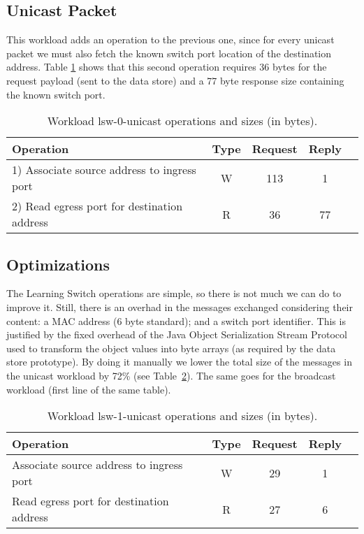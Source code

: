 \subsection{Unicast Packet}
This workload adds an operation to the previous one, since for every unicast packet we must also fetch the known switch port location of the destination address. Table \ref{table:lsw0:unicast} shows that this second operation requires 36 bytes for the request payload (sent to the data store) and a 77 byte response size containing the known switch port.  


\begin{table}[ht]
\small
\centering 
\begin{tabular}{l c c c c}
 Operation & Type & Request & Reply  \\ \toprule 
1) Associate source address to ingress port & W & 113 & 1\\
2) Read egress port for destination address & R & 36 & 77 \\ \bottomrule
\end{tabular}
\caption[Workload lsw-0-unicast operations]{Workload lsw-0-unicast operations and sizes (in bytes).}
\label{table:lsw0:unicast}
\end{table}

\subsection{Optimizations}
\label{sec:optimizations-2}


The Learning Switch operations are simple, so there is not much we can do to improve it.
Still, there is an overhad in the messages exchanged considering their content: a MAC address (6 byte standard); and a switch port identifier.  
This  is justified by the fixed overhead of the Java Object Serialization Stream Protocol~\cite{java-serialization} used to transform the object values into byte arrays (as required by the data store prototype). 
By doing it  manually  we lower the total size of the messages in the unicast workload by 72\% (see Table~\ref{table:lsw1:unicast}). The same goes for the broadcast workload (first line of the same table). 

\begin{table}[ht]
\small
\centering 
\begin{tabular}{l c c c c}
Operation & Type & Request & Reply \\ \toprule 
Associate source address to ingress port & W & 29 & 1\\
Read egress port for destination address & R & 27 & 6 \\ \bottomrule
\end{tabular}
\caption[Workload lsw-1-unicast operations]{Workload lsw-1-unicast operations and sizes (in bytes).}
\label{table:lsw1:unicast}
\end{table}



